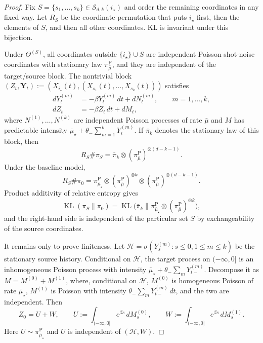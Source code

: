 \documentclass{article}
\newcommand{\KL}{\operatorname{KL}}
\newcommand{\thetalo}{\theta_-}
\begin{document}
\begin{proof}
Fix $S=\{s_1,\dots,s_k\}\in\mathcal S_{d,k}(i_\star)$ and order the remaining
coordinates in any fixed way. Let $R_S$ be the coordinate permutation that puts
$i_\star$ first, then the elements of $S$, and then all other coordinates. KL is
invariant under this bijection.

Under $\Theta^{(S)}$, all coordinates outside $\{i_\star\}\cup S$ are independent
Poisson shot-noise coordinates with stationary law $\pi_{\bar\mu}^{\mathrm P}$,
and they are independent of the target/source block. The nontrivial block
$(Z_t,\mathbf Y_t):=(X_{i_\star}(t),(X_{s_1}(t),\dots,X_{s_k}(t)))$ satisfies
\[
\begin{aligned}
dY_t^{(m)}&=-\beta Y_t^{(m)}\,dt+dN_t^{(m)},\qquad m=1,\dots,k,\\
dZ_t&=-\beta Z_t\,dt+dM_t,
\end{aligned}
\]
where $N^{(1)},\dots,N^{(k)}$ are independent Poisson processes of rate
$\bar\mu$ and $M$ has predictable intensity
$\bar\mu_\star+\thetalo\sum_{m=1}^kY_{t-}^{(m)}$. If $\bar\pi_k$ denotes the
stationary law of this block, then
\[
R_S\#\pi_S=\bar\pi_k\otimes(\pi_{\bar\mu}^{\mathrm P})^{\otimes(d-k-1)}.
\]
Under the baseline model,
\[
R_S\#\pi_0=\pi_{\bar\mu_\star}^{\mathrm P}\otimes
(\pi_{\bar\mu}^{\mathrm P})^{\otimes k}\otimes
(\pi_{\bar\mu}^{\mathrm P})^{\otimes(d-k-1)}.
\]
Product additivity of relative entropy gives
\[
\KL(\pi_S\|\pi_0)=
\KL\!\bigl(\bar\pi_k\|\pi_{\bar\mu_\star}^{\mathrm P}\otimes
(\pi_{\bar\mu}^{\mathrm P})^{\otimes k}\bigr),
\]
and the right-hand side is independent of the particular set $S$ by
exchangeability of the source coordinates.

It remains only to prove finiteness. Let
$\mathcal H=\sigma(Y_s^{(m)}:s\le0,1\le m\le k)$ be the stationary source
history. Conditional on $\mathcal H$, the target process on $(-\infty,0]$ is an
inhomogeneous Poisson process with intensity
$\bar\mu_\star+\thetalo\sum_mY_{t-}^{(m)}$. Decompose it as $M=M^{(0)}+M^{(1)}$,
where, conditional on $\mathcal H$, $M^{(0)}$ is homogeneous Poisson of rate
$\bar\mu_\star$, $M^{(1)}$ is Poisson with intensity
$\thetalo\sum_mY_{t-}^{(m)}\,dt$, and the two are independent. Then
\[
Z_0=U+W,
\qquad
U:=\int_{(-\infty,0]}e^{\beta s}\,dM_s^{(0)},\qquad
W:=\int_{(-\infty,0]}e^{\beta s}\,dM_s^{(1)}.
\]
Here $U\sim\pi_{\bar\mu_\star}^{\mathrm P}$ and $U$ is independent of
$(\mathcal H,W)$.


\end{proof}
\end{document}
